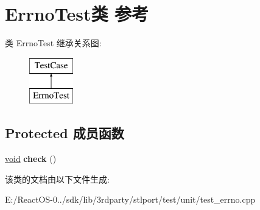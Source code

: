 \hypertarget{class_errno_test}{}\section{Errno\+Test类 参考}
\label{class_errno_test}
类 Errno\+Test 继承关系图\+:\begin{figure}[H]
\begin{center}
\leavevmode
\includegraphics[height=2.000000cm]{class_errno_test}
\end{center}
\end{figure}
\subsection*{Protected 成员函数}
\begin{DoxyCompactItemize}
\item 
\mbox{\label{class_errno_test_a6aa0a8e034e7eb2bfd5a62c3caabda3e}} 
\hyperlink{interfacevoid}{void} {\bfseries check} ()
\end{DoxyCompactItemize}


该类的文档由以下文件生成\+:\begin{DoxyCompactItemize}
\item 
E\+:/\+React\+O\+S-\/0../sdk/lib/3rdparty/stlport/test/unit/test\+\_\+errno.\+cpp\end{DoxyCompactItemize}
